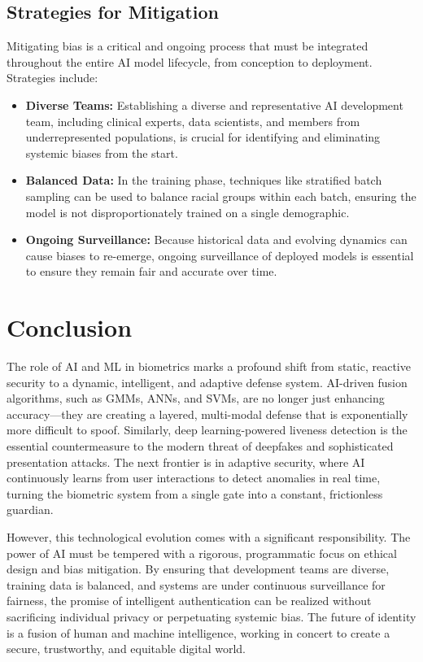 \subsection{Strategies for Mitigation}

Mitigating bias is a critical and ongoing process that must be integrated throughout the entire AI model lifecycle, from conception to deployment. Strategies include:

\begin{itemize}
    \item \textbf{Diverse Teams:} Establishing a diverse and representative AI development team, including clinical experts, data scientists, and members from underrepresented populations, is crucial for identifying and eliminating systemic biases from the start.
    \item \textbf{Balanced Data:} In the training phase, techniques like stratified batch sampling can be used to balance racial groups within each batch, ensuring the model is not disproportionately trained on a single demographic.
    \item \textbf{Ongoing Surveillance:} Because historical data and evolving dynamics can cause biases to re-emerge, ongoing surveillance of deployed models is essential to ensure they remain fair and accurate over time.
\end{itemize}

\section{Conclusion}

The role of AI and ML in biometrics marks a profound shift from static, reactive security to a dynamic, intelligent, and adaptive defense system. AI-driven fusion algorithms, such as GMMs, ANNs, and SVMs, are no longer just enhancing accuracy---they are creating a layered, multi-modal defense that is exponentially more difficult to spoof. Similarly, deep learning-powered liveness detection is the essential countermeasure to the modern threat of deepfakes and sophisticated presentation attacks. The next frontier is in adaptive security, where AI continuously learns from user interactions to detect anomalies in real time, turning the biometric system from a single gate into a constant, frictionless guardian.

However, this technological evolution comes with a significant responsibility. The power of AI must be tempered with a rigorous, programmatic focus on ethical design and bias mitigation. By ensuring that development teams are diverse, training data is balanced, and systems are under continuous surveillance for fairness, the promise of intelligent authentication can be realized without sacrificing individual privacy or perpetuating systemic bias. The future of identity is a fusion of human and machine intelligence, working in concert to create a secure, trustworthy, and equitable digital world.

